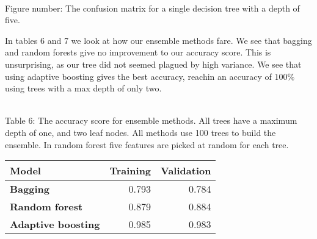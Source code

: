 \documentclass[11pt]{article}
\begin{document}
\begin{center}
\end{center}
{ \hspace*{\fill} \\}
Figure number: The confusion matrix for a single decision tree with a depth of five.

In tables 6 and 7 we look at how our ensemble methods fare. We see that bagging and random forests give no improvement to our accuracy score. This is unsurprising, as our tree did not seemed plagued by high variance. We see that using adaptive boosting gives the best accuracy, reachin an accuracy of $100\%$ using trees with a max depth of only two.

{ \hspace*{\fill} \\}
Table 6: The accuracy score for ensemble methods. All trees have a maximum depth of one, and two leaf nodes. All methods use 100 trees to build the ensemble. In random forest five features are picked at random for each tree. 
\begin{table}[h!]
	\begin{center}
		\label{tab:table1}
		\begin{tabular}{l|r|r}
			\textbf{Model}                                                 	& \textbf{Training} & \textbf{Validation}
			\\ \hline
			\textbf{Bagging}                             		             & 0.793        & 0.784              \\ \hline
			\textbf{Random forest}                                		     & 0.879        & 0.884              \\ \hline
			\textbf{Adaptive boosting}   							    	 & 0.985        & 0.983              \\ \hline
		\end{tabular}
	\end{center}
\end{table}
\end{document}
